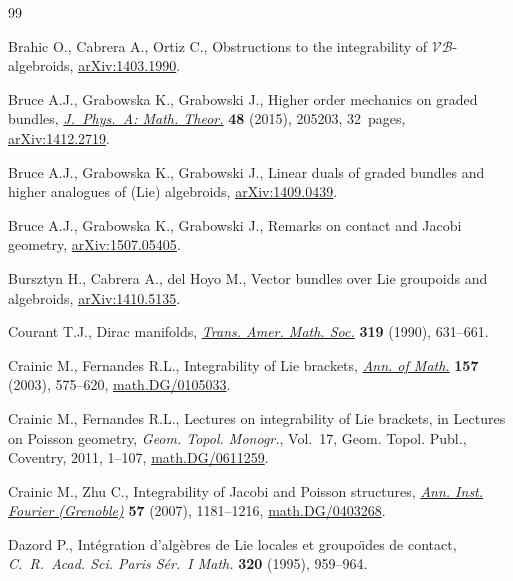 \documentclass[10pt,a4paper]{amsart}
\numberwithin{equation}{section}
\begin{document}
\begin{thebibliography}{99}
\footnotesize\itemsep=0pt

Brahic O., Cabrera A., Ortiz C., Obstructions to the integrability of
  $\mathcal{VB}$-algebroids, \href{http://arxiv.org/abs/1403.1990}{arXiv:1403.1990}.


Bruce A.J., Grabowska K., Grabowski J., Higher order mechanics on graded
  bundles, \href{http://dx.doi.org/10.1088/1751-8113/48/20/205203}{\textit{J.~Phys.~A: Math. Theor.}} \textbf{48} (2015), 205203,
  32~pages, \href{http://arxiv.org/abs/1412.2719}{arXiv:1412.2719}.


Bruce A.J., Grabowska K., Grabowski J., Linear duals of graded bundles and
  higher analogues of (Lie) algebroids, \href{http://arxiv.org/abs/1409.0439}{arXiv:1409.0439}.

Bruce A.J., Grabowska K., Grabowski J., Remarks on contact and Jacobi geometry,
  \href{http://arxiv.org/abs/1507.05405}{arXiv:1507.05405}.

Bursztyn H., Cabrera A., del Hoyo M., Vector bundles over Lie groupoids and
  algebroids, \href{http://arxiv.org/abs/1410.5135}{arXiv:1410.5135}.

Courant T.J., Dirac manifolds, \href{http://dx.doi.org/10.2307/2001258}{\textit{Trans. Amer. Math. Soc.}} \textbf{319}
  (1990), 631--661.

Crainic M., Fernandes R.L., Integrability of {L}ie brackets, \href{http://dx.doi.org/10.4007/annals.2003.157.575}{\textit{Ann. of
  Math.}} \textbf{157} (2003), 575--620, \href{http://arxiv.org/abs/math.DG/0105033}{math.DG/0105033}.

Crainic M., Fernandes R.L., Lectures on integrability of {L}ie brackets, in
  Lectures on {P}oisson geometry, \textit{Geom. Topol. Monogr.}, Vol.~17, Geom.
  Topol. Publ., Coventry, 2011, 1--107, \href{http://arxiv.org/abs/math.DG/0611259}{math.DG/0611259}.

Crainic M., Zhu C., Integrability of {J}acobi and {P}oisson structures,
  \href{http://dx.doi.org/10.5802/aif.2291}{\textit{Ann. Inst. Fourier (Grenoble)}} \textbf{57} (2007), 1181--1216,
  \href{http://arxiv.org/abs/math.DG/0403268}{math.DG/0403268}.

Dazord P., Int\'egration d'alg\`ebres de {L}ie locales et groupo\"\i des de
  contact, \textit{C.~R.~Acad. Sci. Paris S\'er.~I Math.} \textbf{320} (1995),
  959--964.


\end{thebibliography}
\end{document}
